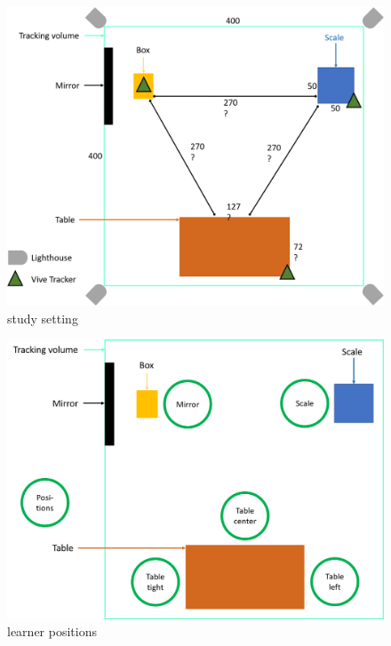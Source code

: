 \begin{figure}[htb]
	\centering
	\includegraphics[width=\textwidth]{figures/study_setting.png}
	\caption[study setting]{study setting}
	\label{fig:study_setting}
\end{figure}

\begin{figure}[htb]
	\centering
	\includegraphics[width=\textwidth]{figures/learner_positions.png}
	\caption[learner positions]{learner positions}
	\label{fig:learner_positions}
\end{figure}

